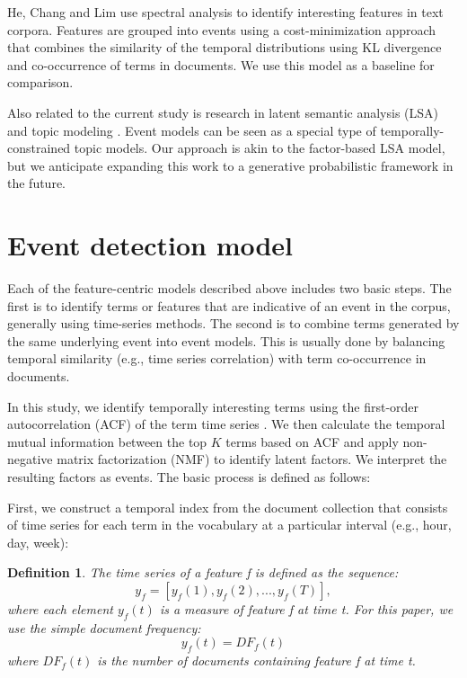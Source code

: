 \documentclass{sig-alternate}
\newtheorem{definition}{Definition}
\begin{document}
He, Chang and Lim \cite{He2007} use spectral analysis to identify interesting features in text corpora. Features are grouped into events using a cost-minimization approach that combines the similarity of the temporal distributions using KL divergence and co-occurrence of terms in documents. We use this model as a baseline for comparison.

Also related to the current study is research in latent semantic analysis (LSA) \cite{Deerwester1990, Hofmann1999} and topic modeling \cite{Blei2003}.  Event models can be seen as a special type of temporally-constrained topic models. Our approach is akin to the factor-based LSA model, but we anticipate expanding this work to a generative probabilistic framework in the future.  




\section{Event detection model}

Each of the feature-centric models described above includes two basic steps. The first is to identify terms or features that are indicative of an event in the corpus, generally using time-series methods. The second is to combine terms generated by the same underlying event into event models.  This is usually done by balancing temporal similarity (e.g., time series correlation) with term co-occurrence in documents.

In this study, we identify temporally interesting terms using the first-order autocorrelation (ACF) of the term time series \cite{Jones2007}. We then calculate the temporal mutual information between the top $K$ terms based on ACF and apply non-negative matrix factorization (NMF) to identify latent factors. We interpret the resulting factors as events. The basic process is defined as follows:

First, we construct a temporal index from the document collection that consists of time series for each term in the vocabulary at a particular interval (e.g., hour, day, week):
\begin{definition}
 The time series of a feature f is defined as the sequence:
\[
y_f = [y_f(1), y_f(2), ..., y_f(T)],
\]
where each element $y_f(t)$ is a measure of feature f at time t. For this paper, we use the simple document frequency:
\[
	y_f(t) = DF_f(t)
\]
where $DF_f(t)$ is the number of documents containing feature f at time t.
\end{definition}
\end{document}
